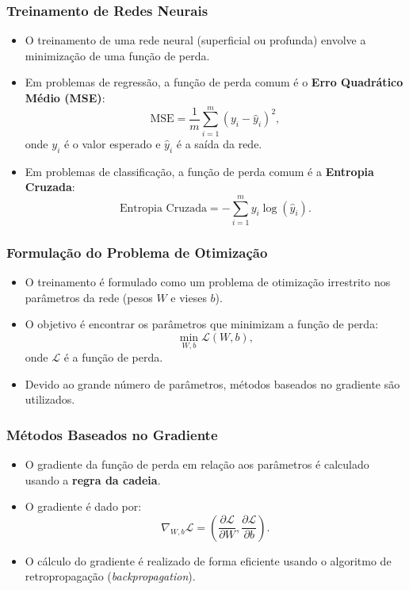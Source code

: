 \documentclass[aspectratio=169]{beamer}
\begin{document}
\begin{frame}
\frametitle{Treinamento de Redes Neurais}
\begin{itemize}
    \item O treinamento de uma rede neural (superficial ou profunda) envolve a minimização de uma função de perda.
    \item Em problemas de regressão, a função de perda comum é o \textbf{Erro Quadrático Médio (MSE)}:
    \[
    \text{MSE} = \frac{1}{m} \sum_{i=1}^m (y_i - \hat{y}_i)^2,
    \]
    onde \( y_i \) é o valor esperado e \( \hat{y}_i \) é a saída da rede.
    \item Em problemas de classificação, a função de perda comum é a \textbf{Entropia Cruzada}:
    \[
    \text{Entropia Cruzada} = -\sum_{i=1}^m y_i \log(\hat{y}_i).
    \]
\end{itemize}
\end{frame}

\begin{frame}
\frametitle{Formulação do Problema de Otimização}
\begin{itemize}
    \item O treinamento é formulado como um problema de otimização irrestrito nos parâmetros da rede (pesos \( W \) e vieses \( b \)).
    \item O objetivo é encontrar os parâmetros que minimizam a função de perda:
    \[
    \min_{W, b} \mathcal{L}(W, b),
    \]
    onde \( \mathcal{L} \) é a função de perda.
    \item Devido ao grande número de parâmetros, métodos baseados no gradiente são utilizados.
\end{itemize}
\end{frame}

\begin{frame}
\frametitle{Métodos Baseados no Gradiente}
\begin{itemize}
    \item O gradiente da função de perda em relação aos parâmetros é calculado usando a \textbf{regra da cadeia}.
    \item O gradiente é dado por:
    \[
    \nabla_{W, b} \mathcal{L} = \left( \frac{\partial \mathcal{L}}{\partial W}, \frac{\partial \mathcal{L}}{\partial b} \right).
    \]
    \item O cálculo do gradiente é realizado de forma eficiente usando o algoritmo de retropropagação (\textit{backpropagation}).
\end{itemize}
\end{frame}
\end{document}
